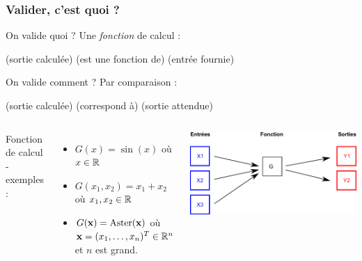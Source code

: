 \documentclass{beamer}
\begin{document}
\begin{frame}[containsverbatim]
\frametitle{Valider, c'est quoi ?}

On valide quoi ? Une \emph{fonction} de calcul :
\begin{center}
(sortie calculée) (est une fonction de) (entrée fournie)
\end{center}

On valide comment ? Par comparaison :
\begin{center}
(sortie calculée) (correspond à) (sortie attendue)
\end{center}

  \begin{columns}

Fonction de calcul - exemples :
\begin{itemize}
\item $G(x)=\sin(x)$ où $x\in\mathbb{R}$
\item $G(x_1,x_2)=x_1+x_2$ où $x_1,x_2\in\mathbb{R}$
\item $G({\bf x})=\textrm{Aster}({\bf x})$ où ${\bf x}=(x_1,\ldots,x_n)^T\in\mathbb{R}^n$ et $n$ est grand.
\end{itemize}


\begin{center}
\includegraphics[width=1.\textwidth]{YGX}
\end{center}

	\end{columns}

\end{frame}

\end{document}
